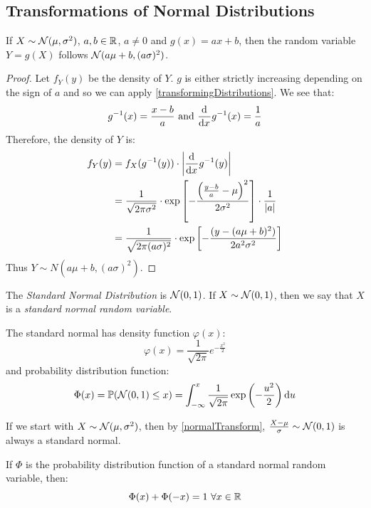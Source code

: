 \documentclass[../main.tex]{subfiles}
\begin{document}
\subsection{Transformations of Normal Distributions}
\begin{proposition}
  If $X \sim \operatorname{\mathcal{N}}(\mu, \sigma^2)$, $a, b \in \mathbb{R}$, $a \neq 0$ and $g(x) = ax + b$, then the random variable $Y = g(X)$ follows $\operatorname{\mathcal{N}}(a\mu + b, (a\sigma)^2)$.
  \label{normalTransform}
\end{proposition}
\begin{proof}
  Let $f_{Y}(y)$ be the density of $Y$.
  $g$ is either strictly increasing depending on the sign of $a$ and so we can apply \cref{transformingDistributions}.
  We see that:
  \[
    g^{-1}(x) = \frac{x - b}{a} \text{ and } \deriv{}{x}g^{-1}(x) = \frac{1}{a}
  \]
  Therefore, the density of $Y$ is:
  \begin{align*}
    f_{Y}(y) &= f_{X}(g^{-1}(y)) \cdot \abs{\deriv{}{x}g^{-1}(y)} \\
             &= \frac{1}{\sqrt{2\pi \sigma^2}} \cdot \exp\left[-\frac{\left(\frac{y - b}{a} - \mu\right)^2}{2 \sigma^2}\right] \cdot \frac{1}{|a|} \\
             &= \frac{1}{\sqrt{2\pi (a \sigma)^2}} \cdot \exp\left[-\frac{(y - (a \mu + b)^2)}{2 a^2 \sigma^2}\right]
  \end{align*}
  Thus $Y \sim N(a\mu + b, (a\sigma)^2)$.
\end{proof}
\begin{definition}
  The \textit{Standard Normal Distribution} is $\operatorname{\mathcal{N}}(0, 1)$.
  If $X \sim \operatorname{\mathcal{N}}(0, 1)$, then we say that $X$ is a \textit{standard normal random variable}.

  The standard normal has density function $\varphi(x)$:
  \[
    \varphi(x) = \frac{1}{\sqrt{2\pi}}e^{-\frac{x^2}{2}}
  \]
  and probability distribution function:
  \[
    \Phi(x) = \P(\normal(0, 1) \leq x) = \int_{-\infty}^{x} \frac{1}{\sqrt{2\pi}} \exp\left(-\frac{u^2}{2}\right) \d{u}
  \]
\end{definition}
\begin{remark}
  If we start with $X \sim \operatorname{\mathcal{N}}(\mu, \sigma^2)$, then by \cref{normalTransform}, $\frac{X - \mu}{\sigma} \sim \operatorname{\mathcal{N}}(0, 1)$ is always a standard normal.
\end{remark}
\begin{lemma}
  If $\Phi$ is the probability distribution function of a standard normal random variable, then:
  \[
    \Phi(x) + \Phi(-x) = 1\ \forall x \in \R
  \]
\end{lemma}
\end{document}
